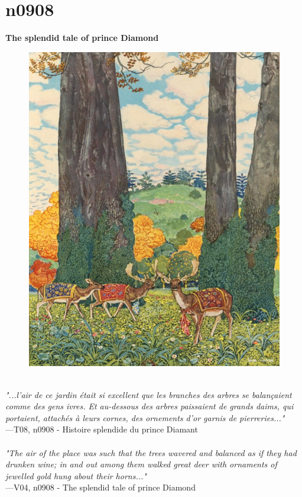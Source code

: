 \documentclass[../Carre_nights.tex]{subfiles}
\begin{document}
\newpage

\section{n0908}
\textbf{\Large{The splendid tale of prince Diamond}} \\

\begin{figure}[ht]
\centering
\includegraphics[height=\figsize]{illustrations/volume_8/T08, n0908 - Histoire splendide du prince Diamant.jpg}
\end{figure}

\textit{\\
"...l’air de ce jardin était si excellent que les branches des arbres se balançaient comme des gens ivres. Et au-dessous des arbres paissaient de grands daims, qui portaient, attachés à leurs cornes, des ornements d’or garnis de pierreries..."} \\
—T08, n0908 - Histoire splendide du prince Diamant \\~\\
\textit{"The air of the place was such that the trees wavered and balanced as if they had drunken wine; in and out among them walked great deer with ornaments of jewelled gold hung about their horns..."} \\
—V04, n0908 - The splendid tale of prince Diamond
\end{document}
